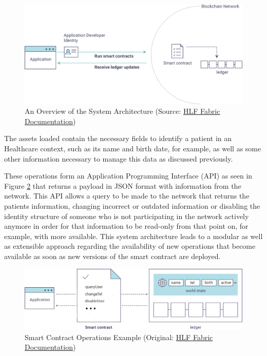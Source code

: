\begin{figure}[ht] \centering
  \includegraphics[width=1\linewidth]{imgs/hyperledgerAppOverview.png}
  \caption{\label{fig:appOverview}An Overview of the System Architecture
  (Source:
  \href{http://hyperledger-fabric.readthedocs.io/en/latest/write_first_app.html}{HLF
  Fabric Documentation})} 
\end{figure}

The assets loaded contain the necessary fields to identify a patient in an
Healthcare context, such as its name and birth date, for example, as well as
some other information necessary to manage this data as discussed previously.


These operations form an Application Programming Interface (API) as seen in
Figure \ref{fig:smartContractOverview} that returns a payload in JSON format
with information from the network. This API allows a query to be made to the
network that returns the patients information, changing incorrect or outdated
information or disabling the identity structure of someone who is not
participating in the network actively anymore in order for that information to
be read-only from that point on, for example, with more available. This system
architecture leads to a modular as well as extensible approach regarding the
availability of new operations that become available as soon as new versions of
the smart contract are deployed.  

\begin{figure}[ht] 
  \centering
  \includegraphics[width=1\linewidth]{imgs/smartContractOverview.png}
  \caption{\label{fig:smartContractOverview}Smart Contract Operations Example
  (Original:
  \href{http://hyperledger-fabric.readthedocs.io/en/latest/write_first_app.html}{HLF
  Fabric Documentation})} 
\end{figure}

